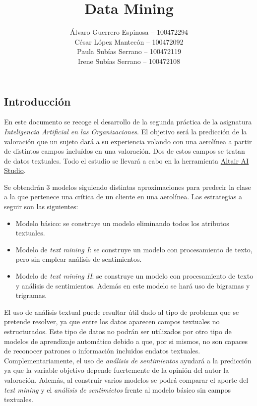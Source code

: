 \documentclass[es]{uc3mreport}
\author{
    Álvaro Guerrero Espinosa -- 100472294 \\
    César López Mantecón -- 100472092 \\
    Paula Subías Serrano -- 100472119 \\
    Irene Subías Serrano -- 100472108
}
\title{Data Mining}
\begin{document}
  \makecover[new]

  \tableofcontents
  \listoffigures
  \listoftables

  \begin{report}

\section{Introducción}
\label{chap:intro}
En este documento se recoge el desarrollo de la segunda práctica de la asignatura \textit{Inteligencia Artificial en las Organizaciones}. El objetivo será la predicción de la valoración que un sujeto dará a su experiencia volando con una aerolínea a partir de distintos campos incluídos en una valoración. Dos de estos campos se tratan de datos textuales. Todo el estudio se llevará a cabo en la herramienta \href{https://altair.com/altair-ai-studio}{Altair AI Studio}.

Se obtendrán 3 modelos siguiendo distintas aproximaciones para predecir la clase a la que pertenece una crítica de un cliente en una aerolínea. Las estrategias a seguir son las siguientes:

\begin{itemize}
    \item Modelo básico: se construye un modelo eliminando todos los atributos textuales.
    \item Modelo de \textit{text mining I}: se construye un modelo con procesamiento de texto, pero sin emplear análisis de sentimientos.
    \item Modelo de \textit{text mining II}: se construye un modelo con procesamiento de texto y análisis de sentimientos. Además en este modelo se hará uso de bigramas y trigramas.
\end{itemize}

El uso de análisis textual puede resultar útil dado al tipo de problema que se
pretende resolver, ya que entre los datos aparecen campos textuales no
estructurados. Este tipo de datos no podrán ser utilizados por otro tipo de
modelos de aprendizaje automático debido a que, por si mismos, no son capaces de
reconocer patrones o información incluidos endatos textuales. Complementariamente,
el uso de \textit{análisis de sentimientos} ayudará a la predicción ya que la variable
objetivo depende fuertemente de la opinión del autor la valoración. Además, 
al construir varios modelos se podrá comparar el aporte del \textit{text mining}
y el \textit{análisis de sentimietos} frente al modelo básico sin campos textuales.


\end{report}
\end{document}
